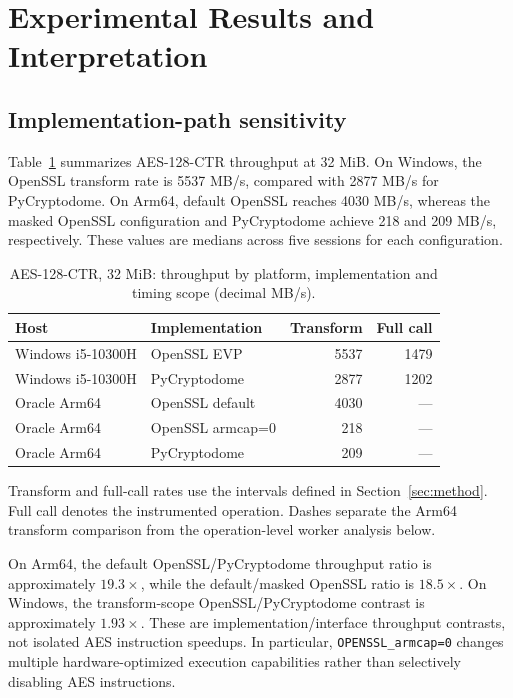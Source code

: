\section{Experimental Results and Interpretation}
\label{sec:results}
\subsection{Implementation-path sensitivity}
Table~\ref{tab:impl} summarizes AES-128-CTR throughput at 32 MiB. On Windows, the OpenSSL transform rate is 5537 MB/s, compared with 2877 MB/s for PyCryptodome. On Arm64, default OpenSSL reaches 4030 MB/s, whereas the masked OpenSSL configuration and PyCryptodome achieve 218 and 209 MB/s, respectively. These values are medians across five sessions for each configuration.

\begin{table}[htbp]\centering\caption{AES-128-CTR, 32 MiB: throughput by platform, implementation and timing scope (decimal MB/s).}\label{tab:impl}\small
\begin{tabular}{llrr}\toprule
Host & Implementation & Transform & Full call\\\midrule
Windows i5-10300H & OpenSSL EVP & 5537 & 1479\\
Windows i5-10300H & PyCryptodome & 2877 & 1202\\
Oracle Arm64 & OpenSSL default & 4030 & ---\\
Oracle Arm64 & OpenSSL armcap=0 & 218 & ---\\
Oracle Arm64 & PyCryptodome & 209 & ---\\\bottomrule\end{tabular}
\par\smallskip\parbox{\linewidth}{\footnotesize Transform and full-call rates use the intervals defined in Section~\ref{sec:method}. Full call denotes the instrumented operation. Dashes separate the Arm64 transform comparison from the operation-level worker analysis below.}
\end{table}

On Arm64, the default OpenSSL/PyCryptodome throughput ratio is approximately $19.3\times$, while the default/masked OpenSSL ratio is $18.5\times$. On Windows, the transform-scope OpenSSL/PyCryptodome contrast is approximately $1.93\times$. These are implementation/interface throughput contrasts, not isolated AES instruction speedups. In particular, \texttt{OPENSSL\_armcap=0} changes multiple hardware-optimized execution capabilities rather than selectively disabling AES instructions.

